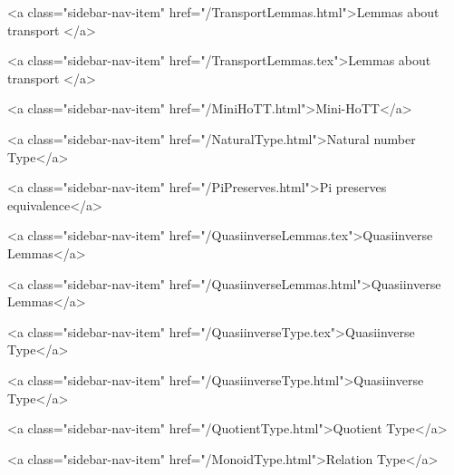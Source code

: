       
        
          <a class="sidebar-nav-item" href="/TransportLemmas.html">Lemmas about transport </a>
        
      
    
      
        
          <a class="sidebar-nav-item" href="/TransportLemmas.tex">Lemmas about transport </a>
        
      
    
      
        
          <a class="sidebar-nav-item" href="/MiniHoTT.html">Mini-HoTT</a>
        
      
    
      
        
          <a class="sidebar-nav-item" href="/NaturalType.html">Natural number Type</a>
        
      
    
      
        
          <a class="sidebar-nav-item" href="/PiPreserves.html">Pi preserves equivalence</a>
        
      
    
      
        
          <a class="sidebar-nav-item" href="/QuasiinverseLemmas.tex">Quasiinverse Lemmas</a>
        
      
    
      
        
          <a class="sidebar-nav-item" href="/QuasiinverseLemmas.html">Quasiinverse Lemmas</a>
        
      
    
      
        
          <a class="sidebar-nav-item" href="/QuasiinverseType.tex">Quasiinverse Type</a>
        
      
    
      
        
          <a class="sidebar-nav-item" href="/QuasiinverseType.html">Quasiinverse Type</a>
        
      
    
      
        
          <a class="sidebar-nav-item" href="/QuotientType.html">Quotient Type</a>
        
      
    
      
        
          <a class="sidebar-nav-item" href="/MonoidType.html">Relation Type</a>
        
